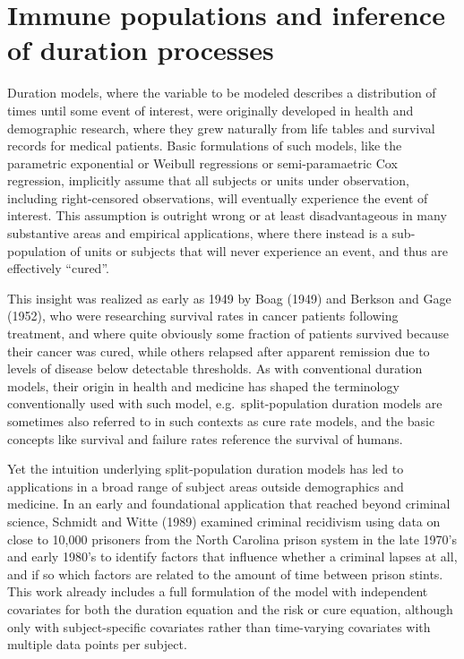 \documentclass[]{article}
\begin{document}
\section{Immune populations and inference of duration
processes}\label{immune-populations-and-inference-of-duration-processes}

Duration models, where the variable to be modeled describes a
distribution of times until some event of interest, were originally
developed in health and demographic research, where they grew naturally
from life tables and survival records for medical patients. Basic
formulations of such models, like the parametric exponential or Weibull
regressions or semi-paramaetric Cox regression, implicitly assume that
all subjects or units under observation, including right-censored
observations, will eventually experience the event of interest. This
assumption is outright wrong or at least disadvantageous in many
substantive areas and empirical applications, where there instead is a
sub-population of units or subjects that will never experience an event,
and thus are effectively ``cured''.

This insight was realized as early as 1949 by Boag (1949) and Berkson
and Gage (1952), who were researching survival rates in cancer patients
following treatment, and where quite obviously some fraction of patients
survived because their cancer was cured, while others relapsed after
apparent remission due to levels of disease below detectable thresholds.
As with conventional duration models, their origin in health and
medicine has shaped the terminology conventionally used with such model,
e.g.~split-population duration models are sometimes also referred to in
such contexts as cure rate models, and the basic concepts like survival
and failure rates reference the survival of humans.

Yet the intuition underlying split-population duration models has led to
applications in a broad range of subject areas outside demographics and
medicine. In an early and foundational application that reached beyond
criminal science, Schmidt and Witte (1989) examined criminal recidivism
using data on close to 10,000 prisoners from the North Carolina prison
system in the late 1970's and early 1980's to identify factors that
influence whether a criminal lapses at all, and if so which factors are
related to the amount of time between prison stints. This work already
includes a full formulation of the model with independent covariates for
both the duration equation and the risk or cure equation, although only
with subject-specific covariates rather than time-varying covariates
with multiple data points per subject.
\end{document}
